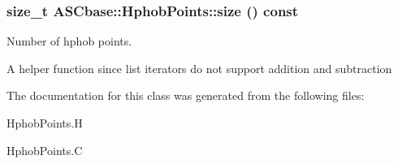 \subsubsection{\setlength{\rightskip}{0pt plus 5cm}size\_\-t ASCbase::Hphob\-Points::size () const\hspace{0.3cm}{\tt  [inline]}}\label{classASCbase_1_1HphobPoints_b1837926d048082c5aaf03d5cd3346cd}


Number of hphob points. 

A helper function since list iterators do not support addition and subtraction 

The documentation for this class was generated from the following files:\begin{CompactItemize}
\item 
Hphob\-Points.H\item 
Hphob\-Points.C\end{CompactItemize}
